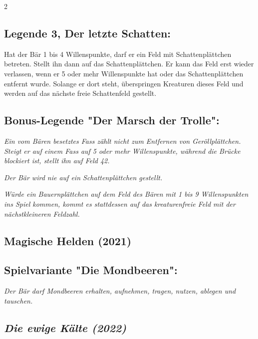 \documentclass[10pt, a4paper, oneside]{book}
\newcommand{\fan}[1]{\textit{#1}}
\begin{document}
\begin{multicols*}{2}
\begin{bgcolor}[color-dz]
\subsection{Legende 3, Der letzte Schatten:}

Hat der Bär 1 bis 4 Willenspunkte, darf er ein Feld mit Schattenplättchen betreten. Stellt ihn dann auf das Schattenplättchen. Er kann das Feld erst wieder verlassen, wenn er 5 oder mehr Willenspunkte hat oder das Schattenplättchen entfernt wurde. Solange er dort steht, überspringen Kreaturen dieses Feld und werden auf das nächste freie Schattenfeld gestellt.
\supercite{dz-begleitheft}


\subsection{Bonus-Legende "Der Marsch der Trolle":}

\fan{Ein vom Bären besetztes Fass zählt nicht zum Entfernen von Geröllplättchen. Steigt er auf einem Fass auf 5 oder mehr Willenspunkte, während die Brücke blockiert ist, stellt ihn auf Feld 42.}

\fan{Der Bär wird nie auf ein Schattenplättchen gestellt.}

\fan{Würde ein Bauernplättchen auf dem Feld des Bären mit 1 bis 9 Willenspunkten ins Spiel kommen, kommt es stattdessen auf das kreaturenfreie Feld mit der nächstkleineren Feldzahl.}

\end{bgcolor}


\columnbreak

\begin{nobgcolor}

\section{Magische Helden (2021)}

\subsection{Spielvariante "Die Mondbeeren":}

\fan{Der Bär darf Mondbeeren erhalten, aufnehmen, tragen, nutzen, ablegen und tauschen.}


\end{nobgcolor}




\begin{bgcolor}
\section{\fan{Die ewige Kälte (2022)}}


\end{bgcolor}
\end{multicols*}
\end{document}
